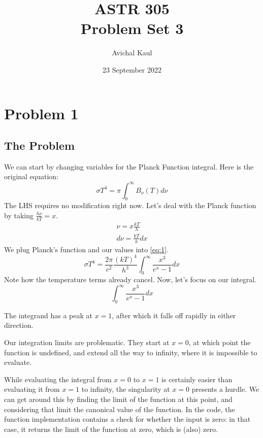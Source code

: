 \documentclass{article}
\title{ASTR 305 \\ Problem Set 3}
\author{Avichal Kaul}
\date{23 September 2022}
\begin{document}
\maketitle

\section{Problem 1}

\subsection{The Problem}
We can start by changing variables for the Planck Function integral. Here is the original equation:
\begin{equation}\label{eq:1}
    \sigma T^{4} = \pi \int_{0}^{\infty}B_{\nu}(T) d\nu
\end{equation}
The LHS requires no modification right now. Let's deal with the Planck function by taking $\frac{h\nu}{kT} = x$.
\begin{gather*}
    \nu = x\frac{kT}{h}\\
    d\nu = \frac{kT}{h}dx
\end{gather*}
We plug Planck's function and our values into \ref{eq:1}.
\begin{equation}\label{eq:2}
    \sigma T^{4} = \frac{2\pi}{c^2} \frac{(kT)^4}{h^3} \int_{0}^{\infty}\frac{x^{3}}{e^{x}-1}dx
\end{equation}
Note how the temperature terms already cancel. Now, let's focus on our integral. 
\begin{equation}\label{eq:3}
    \int_{0}^{\infty}\frac{x^{3}}{e^{x}-1}dx
\end{equation}

The integrand has a peak at $x=1$, after which it falls off rapidly in either direction. 

Our integration limits are problematic. They start at $x=0$, at which point the function is undefined, and extend all the way to infinity, where it is impossible to evaluate.

While evaluating the integral from $x=0$ to $x=1$ is certainly easier than evaluating it from $x=1$ to infinity, the singularity at $x=0$ presents a hurdle. We can get around this by finding the limit of the function at this point, and considering that limit the canonical value of the function. In the code, the function implementation contains a check for whether the input is zero: in that case, it returns the limit of the function at zero, which is (also) zero.
\end{document}
